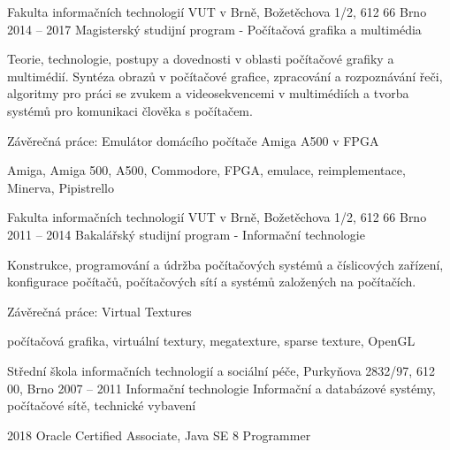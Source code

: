 \documentclass[localFont,alternative]{yaac-another-awesome-cv}
\begin{document}
	\pagebreak

	\begin{projects}
		\project
			{Fakulta informačních technologií VUT v Brně, Božetěchova 1/2, 612 66 Brno}
			{2014 -- 2017}
			{Magisterský studijní program - Počítačová grafika a multimédia}
			{Teorie, technologie, postupy a dovednosti v oblasti počítačové grafiky a multimédií. Syntéza obrazů v počítačové grafice, zpracování a rozpoznávání řeči, algoritmy pro práci se zvukem a videosekvencemi v multimédiích a tvorba systémů pro komunikaci člověka s počítačem.
			
			\bigskip
			
			Závěrečná práce: Emulátor domácího počítače Amiga A500 v FPGA}
			{Amiga, Amiga 500, A500, Commodore, FPGA, emulace, reimplementace, Minerva, Pipistrello}
		
		\project
			{Fakulta informačních technologií VUT v Brně, Božetěchova 1/2, 612 66 Brno}
			{2011 -- 2014}
			{Bakalářský studijní program - Informační technologie}
			{Konstrukce, programování a údržba počítačových systémů a číslicových zařízení, konfigurace počítačů, počítačových sítí a systémů založených na počítačích.
			
			\bigskip
			
			Závěrečná práce: Virtual Textures}
			{počítačová grafika, virtuální textury, megatexture, sparse texture, OpenGL}
		
		\project
			{Střední škola informačních technologií a sociální péče, Purkyňova 2832/97, 612 00, Brno}
			{2007 -- 2011}
			{Informační technologie}
			{Informační a databázové systémy, počítačové sítě, technické vybavení}
			{}
	\end{projects}
	
	\begin{scholarship}
		\scholarshipentry
			{2018}
			{Oracle Certified Associate, Java SE 8 Programmer}
	\end{scholarship}
	
	\begin{skills}
	\end{skills}
\end{document}
